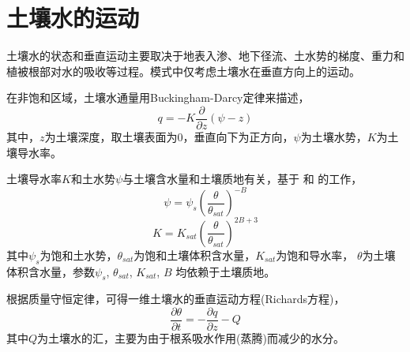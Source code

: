 \section{土壤水的运动}\label{sec:土壤水的运动}
土壤水的状态和垂直运动主要取决于地表入渗、地下径流、土水势的梯度、重力和植被根部对水的吸收等过程。模式中仅考虑土壤水在垂直方向上的运动。


在非饱和区域，土壤水通量用Buckingham-Darcy定律来描述，
\begin{equation}
q=-K \frac{\partial}{\partial z}(\psi-z)
\end{equation}
其中，$z$为土壤深度，取土壤表面为0，垂直向下为正方向，$\psi$为土壤水势，$K$为土壤导水率。


土壤导水率$K$和土水势$\psi$与土壤含水量和土壤质地有关，基于 \citet{clapp1978empirical} 和 \citet{cosby1984statistical} 的工作，
\begin{equation}
\psi=\psi_{s}\left(\frac{\theta}{\theta_{sat}}\right)^{-B}
\end{equation}
\begin{equation}
K=K_{sat}\left(\frac{\theta}{\theta_{sat}}\right)^{2 B+3}
\end{equation}
其中$\psi_s$为饱和土水势，$\theta_{sat}$为饱和土壤体积含水量，$K_{sat}$为饱和导水率，
$\theta$为土壤体积含水量，参数$\psi_s$, $\theta_{sat}$, $K_{sat}$, $B$ 均依赖于土壤质地。


根据质量守恒定律，可得一维土壤水的垂直运动方程(Richards方程)，
\begin{equation}
\frac{\partial \theta}{\partial t}=-\frac{\partial q}{\partial z}-Q
\end{equation}
其中$Q$为土壤水的汇，主要为由于根系吸水作用(蒸腾)而减少的水分。


